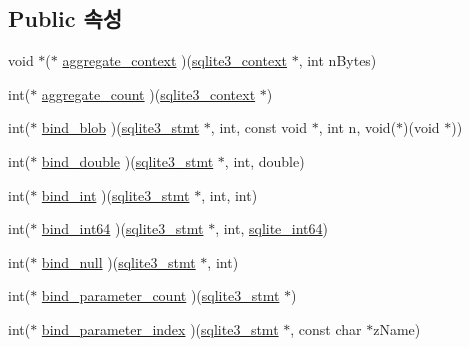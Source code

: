 \subsection*{Public 속성}
\begin{DoxyCompactItemize}
\item 
void $\ast$($\ast$ \hyperlink{structsqlite3__api__routines_a9ab2057c3042c5136b05f7daab66b4f4}{aggregate\+\_\+context} )(\hyperlink{sqlite3_8h_a3b519553ffec8fc42b2356f5b1ebdc57}{sqlite3\+\_\+context} $\ast$, int n\+Bytes)
\item 
int($\ast$ \hyperlink{structsqlite3__api__routines_aa2f39986a5de8ec01fb5cb2aa573c08d}{aggregate\+\_\+count} )(\hyperlink{sqlite3_8h_a3b519553ffec8fc42b2356f5b1ebdc57}{sqlite3\+\_\+context} $\ast$)
\item 
int($\ast$ \hyperlink{structsqlite3__api__routines_a2e84de4afd1ba42151a75df4d7480a72}{bind\+\_\+blob} )(\hyperlink{sqlite3_8h_af2a033da1327cdd77f0a174a09aedd0c}{sqlite3\+\_\+stmt} $\ast$, int, const void $\ast$, int n, void($\ast$)(void $\ast$))
\item 
int($\ast$ \hyperlink{structsqlite3__api__routines_abcdefbe78ab3ce4324d86651c03e8470}{bind\+\_\+double} )(\hyperlink{sqlite3_8h_af2a033da1327cdd77f0a174a09aedd0c}{sqlite3\+\_\+stmt} $\ast$, int, double)
\item 
int($\ast$ \hyperlink{structsqlite3__api__routines_a70b6cc78957f11ff206df6125973daea}{bind\+\_\+int} )(\hyperlink{sqlite3_8h_af2a033da1327cdd77f0a174a09aedd0c}{sqlite3\+\_\+stmt} $\ast$, int, int)
\item 
int($\ast$ \hyperlink{structsqlite3__api__routines_ac71b110c165973291cc257973e7d6243}{bind\+\_\+int64} )(\hyperlink{sqlite3_8h_af2a033da1327cdd77f0a174a09aedd0c}{sqlite3\+\_\+stmt} $\ast$, int, \hyperlink{sqlite3_8h_a520a95f9080c018b2fade39885bd2e2a}{sqlite\+\_\+int64})
\item 
int($\ast$ \hyperlink{structsqlite3__api__routines_a78d546c352de656db3c15e7cc6255228}{bind\+\_\+null} )(\hyperlink{sqlite3_8h_af2a033da1327cdd77f0a174a09aedd0c}{sqlite3\+\_\+stmt} $\ast$, int)
\item 
int($\ast$ \hyperlink{structsqlite3__api__routines_acd345a944505eb7928568f01d7a4fe5a}{bind\+\_\+parameter\+\_\+count} )(\hyperlink{sqlite3_8h_af2a033da1327cdd77f0a174a09aedd0c}{sqlite3\+\_\+stmt} $\ast$)
\item 
int($\ast$ \hyperlink{structsqlite3__api__routines_af4ade5152fd51b1311463014b48dd05d}{bind\+\_\+parameter\+\_\+index} )(\hyperlink{sqlite3_8h_af2a033da1327cdd77f0a174a09aedd0c}{sqlite3\+\_\+stmt} $\ast$, const char $\ast$z\+Name)

\end{DoxyCompactItemize}
